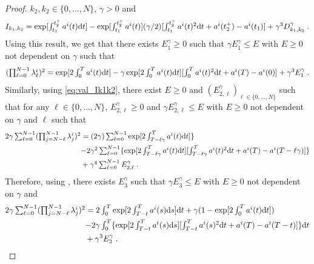 \begin{proof}
  $k_2, k_2 \in \{0, \dots, N\}$, $\gamma >0$ and
\begin{equation}
  \textstyle{I_{k_1, k_2} = \exp[\int_{t_1}^{t_2^+} a^i(t) \mathrm{d}t ] - \exp[\int_{t_1}^{t_2^+} a^i(t)](\gamma/2)[\int_{t_1}^{t_2^+} a^i(t)^2 \mathrm{d}t + a^i(t_2^+) - a^i(t_1)] + \gamma^3 D_{k_1, k_2}^\gamma  \;. } \label{eq:val_Ik1k2}
\end{equation}
Using this result, we get that there exists $E^\gamma_1 \geq 0$ such that
$\gamma E^\gamma_1 \leq E$ with $E \geq 0$ not dependent on $\gamma$ such that
\begin{equation}
  \textstyle{ (\prod_{\ell=0}^{N-1} \lambda_\ell^i)^2 =  \exp[2\int_0^T a^i(t) \mathrm{d}t] - \gamma \exp[2\int_0^T a^i(t) \mathrm{d}t][\int_{0}^{T} a^i(t)^2 \mathrm{d}t + a^i(T) - a^i(0)] + \gamma^3 E_1^\gamma \;. } \label{eq:term_uno}
\end{equation}
Similarly, using \eqref{eq:val_Ik1k2}, there exist $E \geq 0$ and
$(E^\gamma_{2, \ell})_{\ell \in \{0, \dots, N\}}$ such that for any
$\ell \in \{0, \dots, N \}$, $E_{2, \ell}^\gamma \geq 0$ and
$\gamma E^\gamma_{2, \ell} \leq E$ with $E \geq 0$ not dependent on $\gamma$ and
$\ell$ such that
\begin{align}
  \textstyle{2 \gamma \sum_{\ell=0}^{N-1} (\prod_{j=N-\ell}^{N-1} \lambda_j^i)^2} &= \textstyle{ (2\gamma) \sum_{\ell=0}^{N-1}   \exp[2\int_{T-\ell \gamma}^T a^i(t) \mathrm{d}t]\}} \\
                                                                                  & \textstyle{ -2\gamma^2 \sum_{\ell=0}^{N-1} \{ \exp[2\int_{T- \ell \gamma}^T a^i(t) \mathrm{d}t][\int_{T- \ell \gamma}^{T} a^i(t)^2 \mathrm{d}t + a^i(T) - a^i(T-\ell \gamma)] \} } \\
  & + \textstyle{ \gamma^4 \sum_{\ell=0}^{N-1} E_{2, \ell}^\gamma \;. }
\end{align}
Therefore, using , there exists $E_3^\gamma$ such that
$\gamma E_3^\gamma \leq E$ with $E \geq 0$ not dependent on $\gamma$ and
\begin{align}
  \textstyle{2 \gamma \sum_{\ell=0}^{N-1} (\prod_{j=N-\ell}^{N-1} \lambda_j^i)^2} &= \textstyle{2 \int_0^T \exp[2 \int_{T-t}^T a^i(s) \rmd s] \rmd t + \gamma (1 - \exp[2 \int_0^Ta^i(t) \rmd t]) } \\
                                                                                  &\textstyle{-2\gamma \int_0^T \{ \exp[2\int_{T-t}^T a^i(s) \rmd s][\int_{T- t}^{T} a^i(s)^2 \rmd t + a^i(T) - a^i(T-t)] \} \rmd t} \\
  &+ \gamma^3 E_3^\gamma \eqsp . \label{eq:term_duo}

\end{align}
\end{proof}

